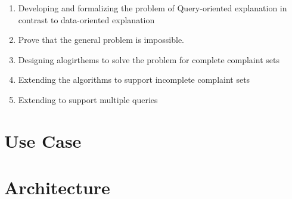 {\begin{enumerate}
\item Developing and formalizing the problem of Query-oriented explanation in contrast to data-oriented explanation
\item Prove that the general problem is impossible.
\item Designing alogirthems to solve the problem for complete complaint sets
\item Extending the algorithms to support incomplete complaint sets
\item Extending to support multiple queries
\end{enumerate}


}

\section{Use Case}

\section{Architecture}









